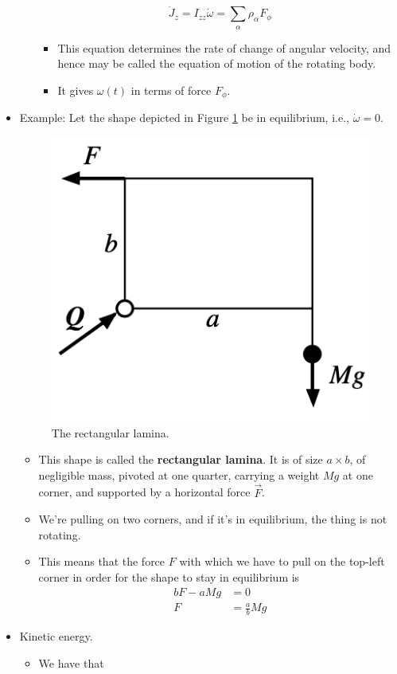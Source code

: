 \documentclass[../notes.tex]{subfiles}
\begin{document}
\begin{itemize}
\begin{itemize}
        \begin{equation*}
            \dot{J}_z = I_{zz}\dot{\omega}
            = \sum_\alpha\rho_\alpha F_\phi
        \end{equation*}
        \begin{itemize}
            \item This equation determines the rate of change of angular velocity, and hence may be called the equation of motion of the rotating body.
            \item It gives $\omega(t)$ in terms of force $F_\phi$.
        \end{itemize}
    \end{itemize}
    \item Example: Let the shape depicted in Figure \ref{fig:rectangularLamina} be in equilibrium, i.e., $\dot{\omega}=0$.
    \begin{figure}[H]
        \centering
        \includegraphics[width=0.22\linewidth]{../ExtFiles/rectangularLamina.png}
        \caption{The rectangular lamina.}
        \label{fig:rectangularLamina}
    \end{figure}
    \begin{itemize}
        \item This shape is called the \textbf{rectangular lamina}. It is of size $a\times b$, of negligible mass, pivoted at one quarter, carrying a weight $Mg$ at one corner, and supported by a horizontal force $\vec{F}$.
        \item We're pulling on two corners, and if it's in equilibrium, the thing is not rotating.
        \item This means that the force $F$ with which we have to pull on the top-left corner in order for the shape to stay in equilibrium is
        \begin{align*}
            bF-aMg &= 0\\
            F &= \frac{a}{b}Mg
        \end{align*}
    \end{itemize}
    \item Kinetic energy.
    \begin{itemize}
        \item We have that
        \begin{equation*}

\end{equation*}
\end{itemize}
\end{itemize}
\end{document}
